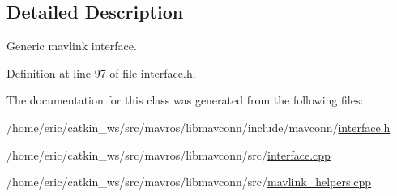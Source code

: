 \subsection{Detailed Description}
Generic mavlink interface. 

Definition at line 97 of file interface.\+h.



The documentation for this class was generated from the following files\+:\begin{DoxyCompactItemize}
\item 
/home/eric/catkin\+\_\+ws/src/mavros/libmavconn/include/mavconn/\mbox{\hyperlink{interface_8h}{interface.\+h}}\item 
/home/eric/catkin\+\_\+ws/src/mavros/libmavconn/src/\mbox{\hyperlink{interface_8cpp}{interface.\+cpp}}\item 
/home/eric/catkin\+\_\+ws/src/mavros/libmavconn/src/\mbox{\hyperlink{mavlink__helpers_8cpp}{mavlink\+\_\+helpers.\+cpp}}\end{DoxyCompactItemize}
